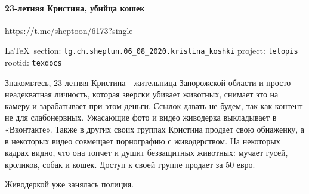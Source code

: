  
 
\paragraph{23-летняя Кристина, убийца кошек}
\url{https://t.me/sheptoon/6173?single}
  
\vspace{0.5cm}
 {\ifDEBUG\small\LaTeX~section: \verb|tg.ch.sheptun.06_08_2020.kristina_koshki| project: \verb|letopis| rootid: \verb|texdocs|	\fi}
\vspace{0.5cm}

Знакомьтесь, 23-летняя Кристина - жительница Запорожской области и просто
неадекватная личность, которая зверски убивает животных, снимает это на камеру
и зарабатывает при этом деньги. Ссылок давать не будем, так как контент не для
слабонервных.  Ужасающие фото и видео живодерка выкладывает в  «Вконтакте».
Также в других своих группах Кристина продает свою обнаженку, а в некоторых
видео совмещает порнографию с живодерством. На некоторых кадрах видно, что она
топчет и душит беззащитных животных: мучает гусей, кроликов, собак и кошек.
Доступ к своей группе продает за 50 евро. 

Живодеркой уже занялась полиция.
  
